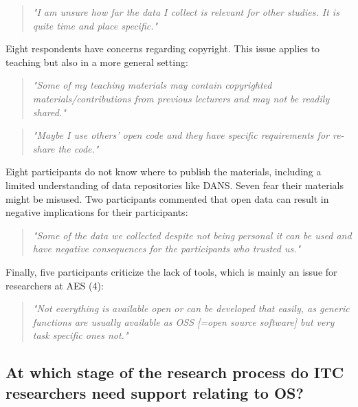 \documentclass[gc, manuscript]{copernicus}
\begin{document}
\begin{quote}
\textit{"I am unsure how far the data I collect is relevant for other studies. It is quite time and place specific."}
\end{quote}

Eight respondents have concerns regarding copyright. This issue applies
to teaching but also in a more general setting:

\begin{quote}
\textit{"Some of my teaching materials may contain copyrighted materials/contributions from previous lecturers and may not be readily shared."}
\end{quote}

\begin{quote}
\textit{"Maybe I use others' open code and they have specific requirements for re-share the code."}
\end{quote}

Eight participants do not know where to publish the materials, including
a limited understanding of data repositories like DANS. Seven fear their
materials might be misused. Two participants commented that open data
can result in negative implications for their participants:

\begin{quote}
\textit{"Some of the data we collected despite not being personal it can be used and have negative consequences for the participants who trusted us."}
\end{quote}

Finally, five participants criticize the lack of tools, which is mainly
an issue for researchers at AES (4):

\begin{quote}
\textit{"Not everything is available open or can be developed that easily, as generic functions are usually available as OSS [=open source software] but very task specific ones not."}
\end{quote}

\subsection{At which stage of the research process do ITC researchers
need support relating to OS?}
\end{document}

